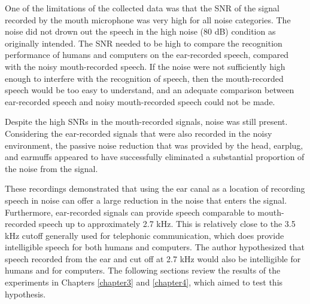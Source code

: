 
One of the limitations of the collected data was that the SNR of the signal recorded by the mouth microphone was very high for all noise categories.  The noise did not drown out the speech in the high noise (80 dB) condition as originally intended.  The SNR needed to be high to compare the recognition performance of humans and computers on the ear-recorded speech, compared with the noisy mouth-recorded speech.  If the noise were not sufficiently high enough to interfere with the recognition of speech, then the mouth-recorded speech would be too easy to understand, and an adequate comparison between ear-recorded speech and noisy mouth-recorded speech could not be made.

Despite the high SNRs in the mouth-recorded signals, noise was still present.  Considering the ear-recorded signals that were also recorded in the noisy environment, the passive noise reduction that was provided by the head, earplug, and earmuffs appeared to have successfully eliminated a substantial proportion of the noise from the signal.

These recordings demonstrated that using the ear canal as a location of recording speech in noise can offer a large reduction in the noise that enters the signal.  Furthermore, ear-recorded signals can provide speech comparable to mouth-recorded speech up to approximately 2.7 kHz.  This is relatively close to the 3.5 kHz cutoff generally used for telephonic communication, which does provide intelligible speech for both humans and computers. The author hypothesized that speech recorded from the ear and cut off at 2.7 kHz would also be intelligible for humans and for computers.  The following sections review the results of the experiments in Chapters \ref{chapter3} and \ref{chapter4}, which aimed to test this hypothesis.


